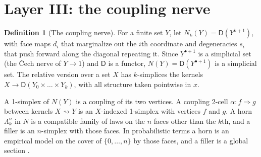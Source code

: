 \documentclass[11pt]{article}
\theoremstyle{definition}
\newtheorem{definition}[theorem]{Definition}
\theoremstyle{remark}
\newcommand{\D}{\mathsf{D}}
\begin{document}
\section{Layer III: the coupling nerve}\label{sec:nerve}

\begin{definition}[The coupling nerve]\label{def:nerve}
For a finite set $Y$, let $N_k(Y)=\D(Y^{k+1})$, with face maps $d_i$ that marginalize out the $i$th coordinate and
degeneracies $s_i$ that push forward along the diagonal repeating it. Since $Y^{\bullet+1}$ is a simplicial set (the
Čech nerve of $Y\to1$) and $\D$ is a functor, $N(Y)=\D(Y^{\bullet+1})$ is a simplicial set. The relative version over a
set $X$ has $k$-simplices the kernels $X\to\D(Y_0\times\dots\times Y_k)$, with all structure taken pointwise in $x$.
\end{definition}

A 1-simplex of $N(Y)$ is a coupling of its two vertices. A coupling 2-cell $\alpha\colon f\Rightarrow g$ between kernels
$X\rightsquigarrow Y$ is an $X$-indexed 1-simplex with vertices $f$ and $g$. A horn $\Lambda^n_k$ in $N$ is a compatible family of
laws on the $n$ faces other than the $k$th, and a filler is an $n$-simplex with those faces. In probabilistic terms
a horn is an empirical model on the cover of $\{0,\dots,n\}$ by those faces, and a filler is a global section
\cite{AbramskyBrandenburger2011}.
\end{document}
